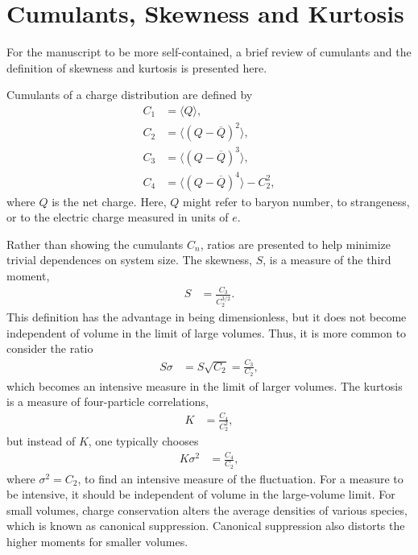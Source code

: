 
\section{Cumulants, Skewness and Kurtosis}\label{sec:cumulants}

For the manuscript to be more self-contained, a brief review of cumulants and the definition of skewness and kurtosis is presented here.

Cumulants of a charge distribution are defined by 
\begin{align}
C_1 &= \langle Q\rangle,\\ \nonumber
C_2 &= \langle(Q-\overline{Q})^2\rangle,\\ \nonumber
C_3 &= \langle(Q-\overline{Q})^3\rangle,\\ \nonumber
C_4 &= \langle(Q-\overline{Q})^4\rangle-C_2^2, \nonumber
\end{align}
where $Q$ is the net charge. Here, $Q$ might refer to baryon number, to strangeness, or to the electric charge measured in units of $e$.

Rather than showing the cumulants $C_n$, ratios are presented to help minimize trivial dependences on system size. The skewness, $S$, is a measure of the third moment,
\begin{eqnarray}
S&=\frac{C_3}{C_2^{3/2}}.
\end{eqnarray}
This definition has the advantage in being dimensionless, but it does not become independent of volume in the limit of large volumes. Thus, it is more common to consider the ratio
\begin{eqnarray}
S\sigma&=S\sqrt{C_2}=\frac{C_3}{C_2},
\end{eqnarray}
which becomes an intensive measure in the limit of larger volumes. The kurtosis is a measure of four-particle correlations,
\begin{eqnarray}
K&=\frac{C_4}{C_2^2},
\end{eqnarray}
but instead of $K$, one typically chooses
\begin{eqnarray}
K\sigma^2&=\frac{C_4}{C_2},
\end{eqnarray}
where $\sigma^2=C_2$, to find an intensive measure of the fluctuation. For a measure to be intensive, it should be independent of volume in the large-volume limit. For small volumes, charge conservation alters the average densities of various species, which is known as canonical suppression. Canonical suppression also distorts the higher moments for smaller volumes.

